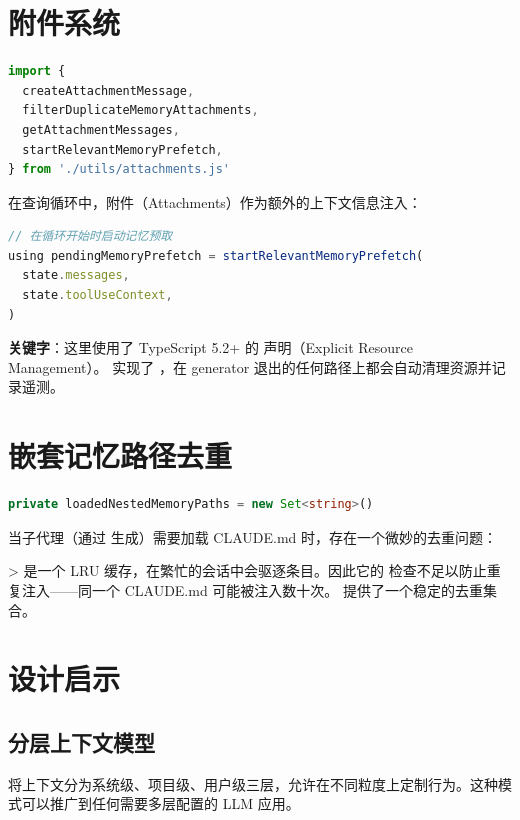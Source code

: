 \section{附件系统}

\begin{lstlisting}[language=TypeScript,breaklines=true]
import {
  createAttachmentMessage,
  filterDuplicateMemoryAttachments,
  getAttachmentMessages,
  startRelevantMemoryPrefetch,
} from './utils/attachments.js'
\end{lstlisting}

在查询循环中，附件（Attachments）作为额外的上下文信息注入：

\begin{lstlisting}[language=TypeScript,breaklines=true]
// 在循环开始时启动记忆预取
using pendingMemoryPrefetch = startRelevantMemoryPrefetch(
  state.messages,
  state.toolUseContext,
)
\end{lstlisting}

\textbf{ 关键字}：这里使用了 TypeScript 5.2+ 的  声明（Explicit Resource Management）。 实现了 ，在 generator 退出的任何路径上都会自动清理资源并记录遥测。

\section{嵌套记忆路径去重}

\begin{lstlisting}[language=TypeScript,breaklines=true]
private loadedNestedMemoryPaths = new Set<string>()
\end{lstlisting}

当子代理（通过  生成）需要加载 CLAUDE.md 时，存在一个微妙的去重问题：

>  是一个 LRU 缓存，在繁忙的会话中会驱逐条目。因此它的  检查不足以防止重复注入——同一个 CLAUDE.md 可能被注入数十次。 提供了一个稳定的去重集合。

\section{设计启示}

\subsection{分层上下文模型}

将上下文分为系统级、项目级、用户级三层，允许在不同粒度上定制行为。这种模式可以推广到任何需要多层配置的 LLM 应用。

